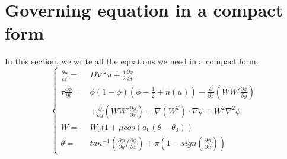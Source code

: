 \documentclass{article}
\begin{document}
    \section{Governing equation in a compact form}
        In this section, we write all the equations we need in a compact form.
        \begin{equation}
            \begin{cases}
                 \frac{\partial u}{\partial t} =&D\nabla^2u+\frac{1}{2}\frac{\partial\phi}{\partial t} \\
                 \tau\frac{\partial \phi}{\partial t} =&  \phi(1-\phi)(\phi-\frac{1}{2}+\tilde{n}(u)) - \frac{\partial}{\partial x}(WW'\frac{\partial\phi}{\partial y})\\
                 &  + \frac{\partial}{\partial y}(WW'\frac{\partial\phi}{\partial x}) + \nabla(W^2)\cdot\nabla\phi + W^2\nabla^2\phi \\
                 W = & W_0(1+\mu cos(a_0(\theta-\theta_0)) \\
                 \theta = & tan^{-1}(\frac{\partial\phi}{\partial y}/\frac{\partial\phi}{\partial x}) + \pi(1-sign(\frac{\partial\phi}{\partial x})) 
            \end{cases}
        \end{equation}
\end{document}
